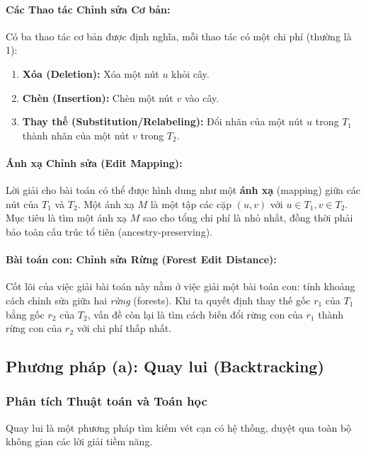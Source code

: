\documentclass[a4paper,12pt]{article}
\begin{document}
\paragraph{Các Thao tác Chỉnh sửa Cơ bản:}
Có ba thao tác cơ bản được định nghĩa, mỗi thao tác có một chi phí (thường là 1):
\begin{enumerate}
    \item \textbf{Xóa (Deletion):} Xóa một nút $u$ khỏi cây.
    \item \textbf{Chèn (Insertion):} Chèn một nút $v$ vào cây.
    \item \textbf{Thay thế (Substitution/Relabeling):} Đổi nhãn của một nút $u$ trong $T_1$ thành nhãn của một nút $v$ trong $T_2$.
\end{enumerate}

\paragraph{Ánh xạ Chỉnh sửa (Edit Mapping):}
Lời giải cho bài toán có thể được hình dung như một \textbf{ánh xạ} (mapping) giữa các nút của $T_1$ và $T_2$. Một ánh xạ $M$ là một tập các cặp $(u, v)$ với $u \in T_1, v \in T_2$. Mục tiêu là tìm một ánh xạ $M$ sao cho tổng chi phí là nhỏ nhất, đồng thời phải bảo toàn cấu trúc tổ tiên (ancestry-preserving).

\paragraph{Bài toán con: Chỉnh sửa Rừng (Forest Edit Distance):}
Cốt lõi của việc giải bài toán này nằm ở việc giải một bài toán con: tính khoảng cách chỉnh sửa giữa hai \textit{rừng} (forests). Khi ta quyết định thay thế gốc $r_1$ của $T_1$ bằng gốc $r_2$ của $T_2$, vấn đề còn lại là tìm cách biến đổi rừng con của $r_1$ thành rừng con của $r_2$ với chi phí thấp nhất.

\subsection{Phương pháp (a): Quay lui (Backtracking)}
\subsubsection{Phân tích Thuật toán và Toán học}
Quay lui là một phương pháp tìm kiếm vét cạn có hệ thống, duyệt qua toàn bộ không gian các lời giải tiềm năng.
\end{document}
